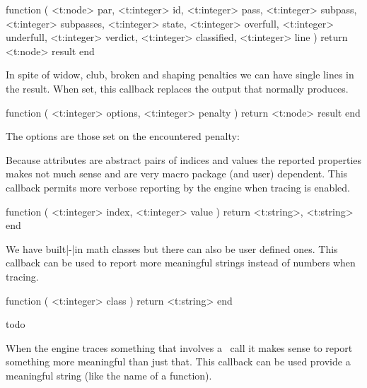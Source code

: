 \stopsubsection

\startsubsection[title=linebreak_quality]

\starttyping[option=LUA]
function (
    <t:node>    par,
    <t:integer> id,
    <t:integer> pass,
    <t:integer> subpass,
    <t:integer> subpasses,
    <t:integer> state,
    <t:integer> overfull,
    <t:integer> underfull,
    <t:integer> verdict,
    <t:integer> classified,
    <t:integer> line
)
    return <t:node> result
end
\stoptyping

\stopsubsection

\startsubsection[title=show_loners]

In spite of widow, club, broken and shaping penalties we can have single lines in the
result. When set, this callback replaces the output that normally \typ {\tracingloners}
produces.

\starttyping[option=LUA]
function (
    <t:integer> options,
    <t:integer> penalty
)
    return <t:node> result
end
\stoptyping

The options are those set on the encountered penalty:

\startthreerows
{}
\stopthreerows

\stopsubsection

\startsubsection[title=get_attribute]

Because attributes are abstract pairs of indices and values the reported
properties makes not much sense and are very macro package (and user) dependent.
This callback permits more verbose reporting by the engine when tracing is
enabled.

\starttyping[option=LUA]
function (
    <t:integer> index,
    <t:integer> value
)
    return <t:string>, <t:string>
end
\stoptyping

\stopsubsection

\startsubsection[title=get_noad_class]

We have built|-|in math classes but there can also be user defined ones. This
callback can be used to report more meaningful strings instead of numbers when
tracing.

\starttyping[option=LUA]
function (
    <t:integer> class
)
    return <t:string>
end
\stoptyping

\stopsubsection

\startsubsection[title=get_math_dictionary]
    todo
\stopsubsection

\startsubsection[title=show_lua_call]

When the engine traces something that involves a \LUA\ call it makes sense to report something
more meaningful than just that. This callback can be used provide a meaningful string (like the
name of a function).

